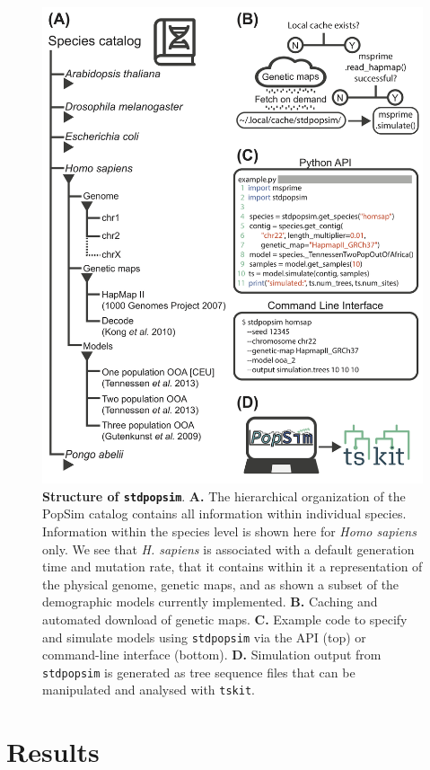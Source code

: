 \documentclass[12pt,halfline,a4paper]{ouparticle}
\newcommand{\stdpopsim}{\texttt{stdpopsim}\xspace}
\begin{document}
\begin{figure}[t]
\begin{center}
\includegraphics[width=0.5\linewidth]{display_items/Figure1.png}
\caption{\textbf{Structure of \stdpopsim}. \textbf{A.} The
hierarchical organization of the PopSim catalog contains all information
within individual species. Information within the species level is shown here
for \emph{Homo sapiens} only. We see that \emph{H. sapiens} is associated
with a default generation time and mutation rate, that it contains within
it a representation of the physical genome, genetic maps, and as shown a
subset of the demographic models currently implemented. \textbf{B.} Caching
and automated download of genetic maps. \textbf{C.} Example code to specify
and simulate models using \stdpopsim via the API (top) or
command-line interface (bottom). \textbf{D.} Simulation output from
\stdpopsim is generated as tree sequence files that can
be manipulated and analysed with \texttt{tskit}.}
\label{fig:cartoon}
\end{center}
\end{figure}

\section*{Results}
\end{document}
